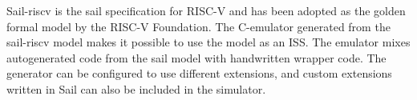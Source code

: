 Sail-riscv is the sail specification for RISC-V and has been adopted as the golden formal model by the RISC-V Foundation. 
The C-emulator generated from the sail-riscv model makes it possible to use the model as an ISS. The emulator mixes autogenerated code from the sail model with handwritten wrapper code. The generator can be configured to use different extensions, and custom extensions written in Sail can also be included in the simulator. 





